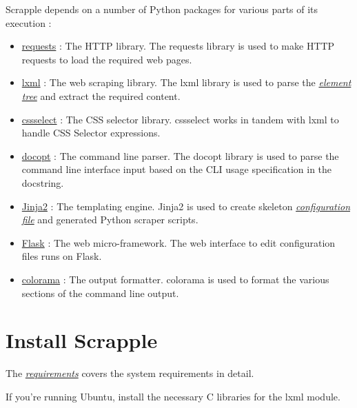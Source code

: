 \documentclass[letterpaper,12pt,english]{sphinxmanual}
\begin{document}
Scrapple depends on a number of Python packages for various parts of its execution :
\begin{itemize}
\item {} 
\href{https://pypi.python.org/pypi/requests}{requests} : The HTTP library. The requests library is used to make HTTP requests to load the required web pages.

\item {} 
\href{https://pypi.python.org/pypi/lxml/3.4.0}{lxml} : The web scraping library. The lxml library is used to parse the {\hyperref[concepts/structure:concepts-structure]{\emph{element tree}}} and extract the required content.

\item {} 
\href{https://pypi.python.org/pypi/cssselect}{cssselect} : The CSS selector library. cssselect works in tandem with lxml to handle CSS Selector expressions.

\item {} 
\href{https://pypi.python.org/pypi/docopt}{docopt} : The command line parser. The docopt library is used to parse the command line interface input based on the CLI usage specification in the docstring.

\item {} 
\href{http://jinja.pocoo.org/}{Jinja2} : The templating engine. Jinja2 is used to create skeleton {\hyperref[framework/config:framework-config]{\emph{configuration file}}} and generated Python scraper scripts.

\item {} 
\href{http://flask.pocoo.org/}{Flask} : The web micro-framework. The web interface to edit configuration files runs on Flask.

\item {} 
\href{https://pypi.python.org/pypi/colorama}{colorama} : The output formatter. colorama is used to format the various sections of the command line output.

\end{itemize}


\section{Install Scrapple}
\label{intro/install::doc}\label{intro/install:colorama}\label{intro/install:intro-install}\label{intro/install:install-scrapple}
The {\hyperref[intro/requirements::doc]{\emph{requirements}}} covers the system requirements in detail.

If you're running Ubuntu, install the necessary C libraries for the lxml module.
\end{document}
